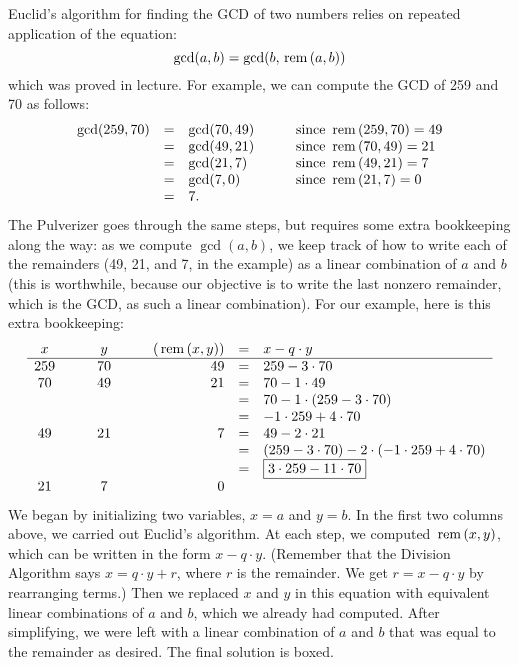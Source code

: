 \documentclass[12pt]{article}
\begin{document}
{\noindent
Euclid's algorithm for finding the GCD of two numbers relies on
repeated application of the equation: 
\[
\gcd(a, b) = \gcd(b, \operatorname{\,rem\,}(a,b))
\]
which was proved in lecture.  For 
example, we can compute the GCD of 259 and 70 as follows:
\[
\begin{array}{rclcl}
\gcd(259, 70)
    & = & \gcd(70, 49) & \quad & \text{since $\operatorname{\,rem\,}(259,70) = 49$}\\
    & = & \gcd(49, 21) && \text{since $\operatorname{\,rem\,}(70,49) = 21$} \\
    & = & \gcd(21, 7) && \text{since $\operatorname{\,rem\,}(49,21) = 7$} \\
    & = & \gcd(7, 0) && \text{since $\operatorname{\,rem\,}(21,7) = 0$} \\
    & = & 7.
\end{array}
\]
The Pulverizer goes through the same steps, but requires some extra
bookkeeping along the way: as we compute $\gcd(a, b)$, we keep track
of how to write each of the remainders (49, 21, and 7, in the example)
as a linear combination of $a$ and $b$ (this is worthwhile, because
our objective is to write the last nonzero remainder, which is the
GCD, as such a linear combination).  For our example, here is this
extra bookkeeping:
\[
\begin{array}{ccccrcl}
x & \quad & y & \quad & (\operatorname{\,rem\,}(x,y)) & = & x - q \cdot y \\ \hline
259 && 70 && 49 & = &   259 - 3 \cdot 70 \\
70 && 49 && 21  & = &   70 - 1 \cdot 49 \\
&&&&            & = &   70 - 1 \cdot (259 - 3 \cdot 70) \\
&&&&            & = &   -1 \cdot 259 + 4 \cdot 70 \\
49 && 21 && 7   & = &   49 - 2 \cdot 21 \\
&&&&            & = &   (259 - 3 \cdot 70) -
                                2 \cdot (-1 \cdot 259 + 4 \cdot 70) \\
&&&&            & = &   \fbox{$3 \cdot 259 - 11 \cdot 70$} \\
21 && 7 && 0
\end{array}
\]
We began by initializing two variables, $x = a$ and $y = b$.  In the
first two columns above, we carried out Euclid's algorithm.  At each
step, we computed $\operatorname{\,rem\,}(x,y)$, which can be written in the form $x - q
\cdot y$.  (Remember that the Division Algorithm says $x = q \cdot y +
r$, where $r$ is the remainder.  We get $r = x - q \cdot y$ by
rearranging terms.)  Then we replaced $x$ and $y$ in this equation
with equivalent linear combinations of $a$ and $b$, which we already
had computed.  After simplifying, we were left with a linear
combination of $a$ and $b$ that was equal to the remainder as desired.
The final solution is boxed.

\newpage
} %
\end{document}
